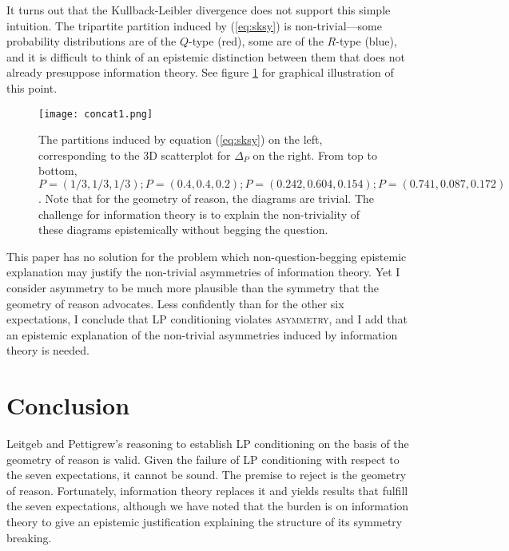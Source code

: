 \documentclass[11pt]{article}
\begin{document}
It turns out that the Kullback-Leibler divergence does not support
this simple intuition. The tripartite partition induced by
(\ref{eq:sksy}) is non-trivial---some probability distributions are of
the $Q$-type (red), some are of the $R$-type (blue), and it is
difficult to think of an epistemic distinction between them that does
not already presuppose information theory. See figure \ref{fig:concat}
for graphical illustration of this point.

\begin{figure}[ht]
  \begin{flushright}
    \begin{minipage}[h]{.82\linewidth}
      \texttt{[image: concat1.png]}
      \caption{\footnotesize The partitions induced by equation
        (\ref{eq:sksy}) on the left, corresponding to the 3D
        scatterplot for $\Delta_{P}$ on the right. From top to bottom,
        $P=(1/3,1/3,1/3); P=(0.4,0.4,0.2); P=(0.242,0.604,0.154);
        P=(0.741,0.087,0.172)$.
        Note that for the geometry of reason, the diagrams are
        trivial. The challenge for information theory is to explain
        the non-triviality of these diagrams epistemically without
        begging the question.}
      \label{fig:concat}
    \end{minipage}
  \end{flushright}
\end{figure}

This paper has no solution for the problem which non-question-begging
epistemic explanation may justify the non-trivial asymmetries of
information theory. Yet I consider asymmetry to be much more plausible
than the symmetry that the geometry of reason advocates. Less
confidently than for the other six expectations, I conclude that LP
conditioning violates \textsc{asymmetry}, and I add that an epistemic
explanation of the non-trivial asymmetries induced by information
theory is needed.

\section{Conclusion}
\label{ascc}

Leitgeb and Pettigrew's reasoning to establish LP conditioning on the
basis of the geometry of reason is valid. Given the failure of LP
conditioning with respect to the seven expectations, it cannot be
sound. The premise to reject is the geometry of reason. Fortunately,
information theory replaces it and yields results that fulfill the
seven expectations, although we have noted that the burden is on
information theory to give an epistemic justification explaining the
structure of its symmetry breaking.

 

\end{document}
